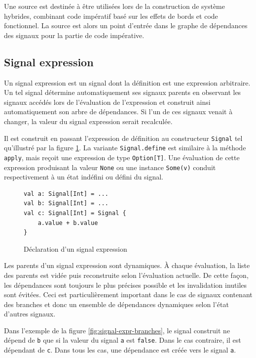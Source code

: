 Une source est destinée à être utilisées lors de la construction de système hybrides, combinant code impératif basé sur les effets de bords et code fonctionnel. La source est alors un point d'entrée dans le graphe de dépendances des signaux pour la partie de code impérative.

\subsection{Signal expression} \label{sec:sig-expr}

Un signal expression est un signal dont la définition est une expression arbitraire. Un tel signal détermine automatiquement ses signaux parents en observant les signaux accédés lors de l'évaluation de l'expression et construit ainsi automatiquement son arbre de dépendances. Si l'un de ces signaux venait à changer, la valeur du signal expression serait recalculée.

Il est construit en passant l'expression de définition au constructeur \texttt{Signal} tel qu'illustré par la figure \ref{fig:signal-expr-init}. La variante \texttt{Signal.define} est similaire à la méthode \texttt{apply}, mais reçoit une expression de type \texttt{Option[T]}. Une évaluation de cette expression produisant la valeur \texttt{None} ou une instance \texttt{Some(v)} conduit respectivement à un état indéfini ou défini du signal.

\begin{figure}[!h]
	\begin{lstlisting}
val a: Signal[Int] = ...
val b: Signal[Int] = ...
val c: Signal[Int] = Signal {
	a.value + b.value
}
	\end{lstlisting}
	\caption{Déclaration d'un signal expression}
	\label{fig:signal-expr-init}
\end{figure}

Les parents d'un signal expression sont dynamiques. À chaque évaluation, la liste des parents est vidée puis reconstruite selon l'évaluation actuelle. De cette façon, les dépendances sont toujours le plus précises possible et les invalidation inutiles sont évitées. Ceci est particulièrement important dans le cas de signaux contenant des branches et donc un ensemble de dépendances dynamiques selon l'état d'autres signaux.

Dans l'exemple de la figure \ref{fig:signal-expr-branches}, le signal construit ne dépend de \texttt{b} que si la valeur du signal \texttt{a} est \texttt{false}. Dans le cas contraire, il est dépendant de \texttt{c}. Dans tous les cas, une dépendance est créée vers le signal \texttt{a}.

